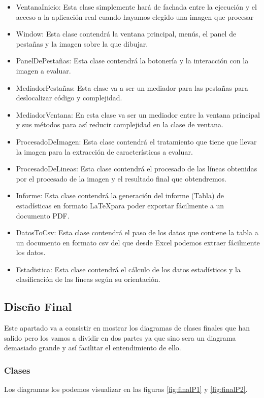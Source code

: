 \begin{itemize}
	\item VentanaInicio: 
Esta clase simplemente hará de fachada entre la ejecución y el acceso a la aplicación real cuando hayamos elegido una imagen que procesar
	\item Window:
Esta clase contendrá la ventana principal, menús, el panel de pestañas y la imagen sobre la que dibujar.
	\item PanelDePestañas:
Esta clase contendrá la botonería y la interacción con la imagen a evaluar.
	\item MediadorPestañas:
Esta clase va a ser un mediador para las pestañas para deslocalizar código y complejidad.
	\item MediadorVentana:
En esta clase va ser un mediador entre la ventana principal y sus métodos para así reducir complejidad en la clase de ventana.
	\item ProcesadoDeImagen:
Esta clase contendrá el tratamiento que tiene que llevar la imagen para la extracción de características a evaluar.
	\item ProcesadoDeLineas:
Esta clase contendrá el procesado de las líneas obtenidas por el procesado de la imagen y el resultado final que obtendremos.
	\item Informe: 
Esta clase contendrá la generación del informe (Tabla) de estadísticas en formato \LaTeX para poder exportar fácilmente a un documento PDF.
	\item DatosToCsv:
Esta clase contendrá el paso de los datos que contiene la tabla a un documento en formato csv del que desde Excel podemos extraer fácilmente los datos.
	\item Estadistica: 
Esta clase contendrá el cálculo de los datos estadísticos y la clasificación de las líneas según su orientación.
\end{itemize}


\subsection{Diseño Final}
Este apartado va a consistir en mostrar los diagramas de clases finales que han salido pero los vamos a dividir en dos partes ya que sino sera un diagrama demasiado grande y así facilitar el entendimiento de ello.


\subsubsection{Clases}
Los diagramas los podemos visualizar en las figuras \ref{fig:finalP1} y \ref{fig:finalP2}.

